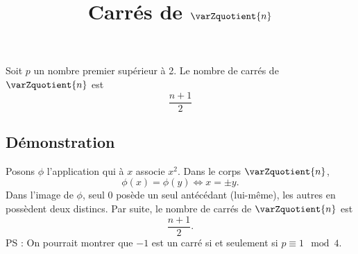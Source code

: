 \documentclass[fontsize=12pt,twoside=false,parskip=half, french]{scrartcl}
\title{Carrés de $\varZquotient{n}$}
\date{}
\author{}
\begin{document}
\maketitle
   \begin{Theoreme}
      Soit $p$ un nombre premier supérieur à 2. Le nombre de carrés de $\varZquotient{n}$ est
      \[
         \frac{n + 1}{2}
      \]
   \end{Theoreme}
   \subsection{Démonstration}
      Posons $\phi$ l’application qui à $x$ associe $x^2$. Dans le corps $\varZquotient{n}$,
      \[
         \phi(x) = \phi(y) \iff x = \pm y.
      \]
      Dans l’image de $\phi$, seul $0$ posède un seul antécédant (lui-même), les autres en possèdent deux distincs. Par suite, 
      le nombre de carrés de $\varZquotient{n}$ est
      \[
         \frac{n + 1}{2}.
      \]
      PS : On pourrait montrer que $-1$ est un carré si et seulement si $p \equiv 1 \mod 4$.
\end{document}
